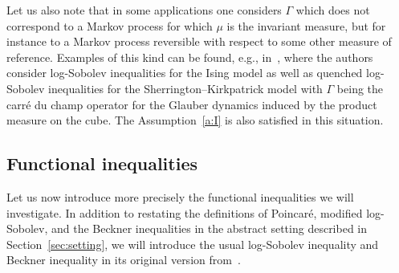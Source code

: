 \documentclass[a4paper]{amsart}
\theoremstyle{definition}
\theoremstyle{remark}
\numberwithin{equation}{section}
\begin{document}
Let us also note that in some applications one considers $\Gamma$ which does not correspond to a Markov process for which $\mu$ is the invariant measure, but for instance to a Markov process reversible with respect to some other measure of reference. Examples of this kind can be found, e.g., in~\cite{MR3926125}, where the authors consider log-Sobolev inequalities for the Ising model as well as quenched log-Sobolev inequalities for the Sherrington--Kirkpatrick model with $\Gamma$ being the carr\'e du champ operator for the Glauber dynamics induced by the product measure on the cube. The Assumption~\ref{a:I} is also satisfied in this situation.


\subsection{Functional inequalities} \label{sec:state-of-art}\label{sec:SOA}

Let us now introduce more precisely the functional inequalities we will investigate. In addition to restating the definitions of Poincar\'e, modified log-Sobolev, and the Beckner inequalities in the abstract setting described in Section~\ref{sec:setting}, we will introduce the usual log-Sobolev inequality and Beckner inequality in its original version from~\cite{MR954373}.
\end{document}
